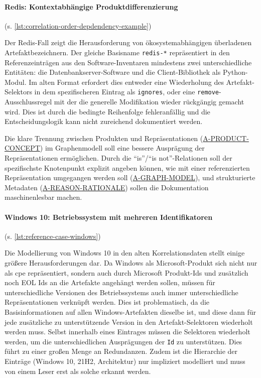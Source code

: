 \paragraph{Redis: Kontextabhängige Produktdifferenzierung}\label{par:reference-case-redis} (s. \autoref{lst:correlation-order-depdendency-example})

Der Redis-Fall zeigt die Herausforderung von ökosystemabhängigen überladenen Artefaktbezeichnern.
Der gleiche Basisname \texttt{redis-*} repräsentiert in den Referenzeinträgen aus den Software-Inventaren mindestens zwei unterschiedliche Entitäten: die Datenbankserver-Software und die Client-Bibliothek als Python-Modul.
Im alten Format erfordert dies entweder eine Wiederholung des Artefakt-Selektors in dem spezifischeren Eintrag als \texttt{ignores}, oder eine \texttt{remove}-Ausschlussregel mit der die generelle Modifikation wieder rückgängig gemacht wird.
Dies ist durch die bedingte Reihenfolge fehleranfällig und die Entscheidungslogik kann nicht zureichend dokumentiert werden.

Die klare Trennung zwischen Produkten und Repräsentationen (\hyperref[subsec:req-product-concept]{A-PRODUCT-CONCEPT}) im Graphenmodell soll eine bessere Ausprägung der Repräsentationen ermöglichen.
Durch die \enquote{is}/\enquote{is not}-Relationen soll der spezifischste Knotenpunkt explizit angeben können, wie mit einer referenzierten Repräsentation umgegangen werden soll (\hyperref[subsec:req-format-product-graph]{A-GRAPH-MODEL}), und strukturierte Metadaten (\hyperref[subsec:req-reason-format]{A-REASON-RATIONALE}) sollen die Dokumentation maschinenlesbar machen.

\paragraph{Windows 10: Betriebssystem mit mehreren Identifikatoren}\label{par:reference-case-windows} (s. \autoref{lst:reference-case-windows})

Die Modellierung von Windows 10 in den alten Korrelationsdaten stellt einige größere Herausforderungen dar.
Da Windows als Microsoft-Produkt sich nicht nur als \acrshort{cpe} repräsentiert, sondern auch durch Microsoft Produkt-Ids und zusätzlich noch EOL Ids an die Artefakte angehängt werden sollen, müssen für unterschiedliche Versionen des Betriebssystems auch immer unterschiedliche Repräsentationen verknüpft werden.
Dies ist problematisch, da die Basisinformationen auf allen Windows-Artefakten dieselbe ist, und diese dann für jede zusätzliche zu unterstützende Version in den Artefakt-Selektoren wiederholt werden muss.
Selbst innerhalb eines Eintrages müssen die Selektoren wiederholt werden, um die unterschiedlichen Ausprägungen der \texttt{Id} zu unterstützen.
Dies führt zu einer großen Menge an Redundanzen.
Zudem ist die Hierarchie der Einträge (Windows 10, 21H2, Architektur) nur impliziert modelliert und muss von einem Leser erst als solche erkannt werden.


